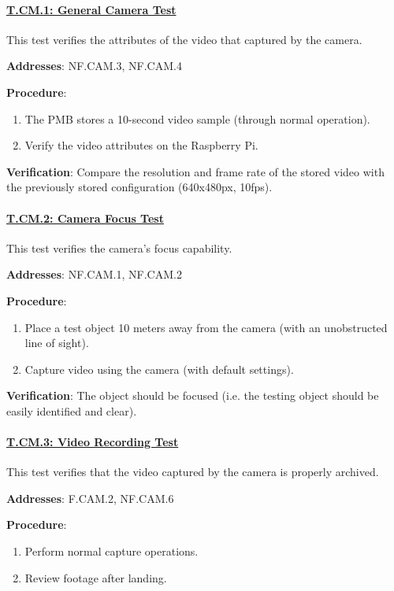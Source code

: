 \paragraph{\underline{T.CM.1: General Camera Test}}

This test verifies the attributes of the video that captured by the camera.

\textbf{Addresses}: NF.CAM.3, NF.CAM.4

\textbf{Procedure}:
\begin{enumerate}[noitemsep]
    \item The PMB stores a 10-second video sample (through normal operation).
    \item Verify the video attributes on the Raspberry Pi.
\end{enumerate}

\textbf{Verification}: 
Compare the resolution and frame rate of the stored video with the previously stored configuration (640x480px, 10fps).

%

\paragraph{\underline{T.CM.2: Camera Focus Test}}

This test verifies the camera's focus capability.

\textbf{Addresses}: NF.CAM.1, NF.CAM.2

\textbf{Procedure}:
\begin{enumerate}[noitemsep]
    \item Place a test object 10 meters away from the camera (with an unobstructed line of sight).
    \item Capture video using the camera (with default settings).
\end{enumerate}

\textbf{Verification}: 
The object should be focused (i.e. the testing object should be easily identified and clear).

%

\paragraph{\underline{T.CM.3: Video Recording Test}}

This test verifies that the video captured by the camera is properly archived.

\textbf{Addresses}: F.CAM.2, NF.CAM.6

\textbf{Procedure}:
\begin{enumerate}[noitemsep]
    \item Perform normal capture operations.
    \item Review footage after landing.
\end{enumerate}


